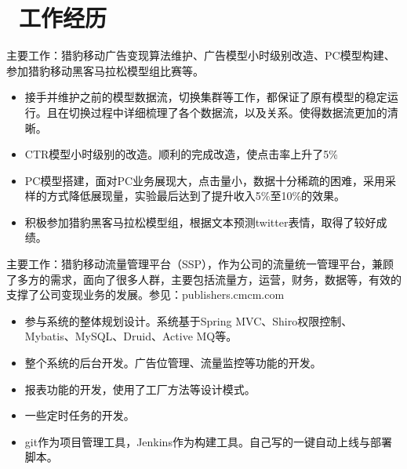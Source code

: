 \documentclass{resume}
\begin{document}



\section{\faUsers\ 工作经历}
\role{CTR、CVR预估}{广告算法}
\begin{onehalfspacing}
主要工作：猎豹移动广告变现算法维护、广告模型小时级别改造、PC模型构建、参加猎豹移动黑客马拉松模型组比赛等。
\begin{itemize}
  \item 接手并维护之前的模型数据流，切换集群等工作，都保证了原有模型的稳定运行。且在切换过程中详细梳理了各个数据流，以及关系。使得数据流更加的清晰。 
  \item CTR模型小时级别的改造。顺利的完成改造，使点击率上升了5\%
  \item PC模型搭建，面对PC业务展现大，点击量小，数据十分稀疏的困难，采用采样的方式降低展现量，实验最后达到了提升收入5\%至10\%的效果。
  \item 积极参加猎豹黑客马拉松模型组，根据文本预测twitter表情，取得了较好成绩。
\end{itemize}
\end{onehalfspacing}

\begin{onehalfspacing}
主要工作：猎豹移动流量管理平台（SSP），作为公司的流量统一管理平台，兼顾了多方的需求，面向了很多人群，主要包括流量方，运营，财务，数据等，有效的支撑了公司变现业务的发展。参见：publishers.cmcm.com
\begin{itemize}
  \item 参与系统的整体规划设计。系统基于Spring MVC、Shiro权限控制、Mybatis、MySQL、Druid、Active MQ等。
  \item 整个系统的后台开发。广告位管理、流量监控等功能的开发。
  \item 报表功能的开发，使用了工厂方法等设计模式。
  \item 一些定时任务的开发。
  \item git作为项目管理工具，Jenkins作为构建工具。自己写的一键自动上线与部署脚本。 
\end{itemize}
\end{onehalfspacing}
\end{document}
